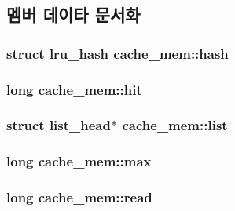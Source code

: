 \subsection{멤버 데이타 문서화}
\hypertarget{structcache__mem_a33b5307112f19826b77d6bcaf8044638}{
\subsubsection[{hash}]{\setlength{\rightskip}{0pt plus 5cm}struct {\bf lru\+\_\+hash} cache\+\_\+mem\+::hash}}\label{structcache__mem_a33b5307112f19826b77d6bcaf8044638}
\hypertarget{structcache__mem_a2b8742701cf4beaff0639d36d52209d9}{
\subsubsection[{hit}]{\setlength{\rightskip}{0pt plus 5cm}long cache\+\_\+mem\+::hit}}\label{structcache__mem_a2b8742701cf4beaff0639d36d52209d9}
\hypertarget{structcache__mem_a785dde86afb87f8825779f50e29d6bd7}{
\subsubsection[{list}]{\setlength{\rightskip}{0pt plus 5cm}struct {\bf list\+\_\+head}$\ast$ cache\+\_\+mem\+::list}}\label{structcache__mem_a785dde86afb87f8825779f50e29d6bd7}
\hypertarget{structcache__mem_aca41dfab3073387e6c6063457a17f616}{
\subsubsection[{max}]{\setlength{\rightskip}{0pt plus 5cm}long cache\+\_\+mem\+::max}}\label{structcache__mem_aca41dfab3073387e6c6063457a17f616}
\hypertarget{structcache__mem_af64061b621392a1872f5cb92dde7dc7c}{
\subsubsection[{read}]{\setlength{\rightskip}{0pt plus 5cm}long cache\+\_\+mem\+::read}}\label{structcache__mem_af64061b621392a1872f5cb92dde7dc7c}
